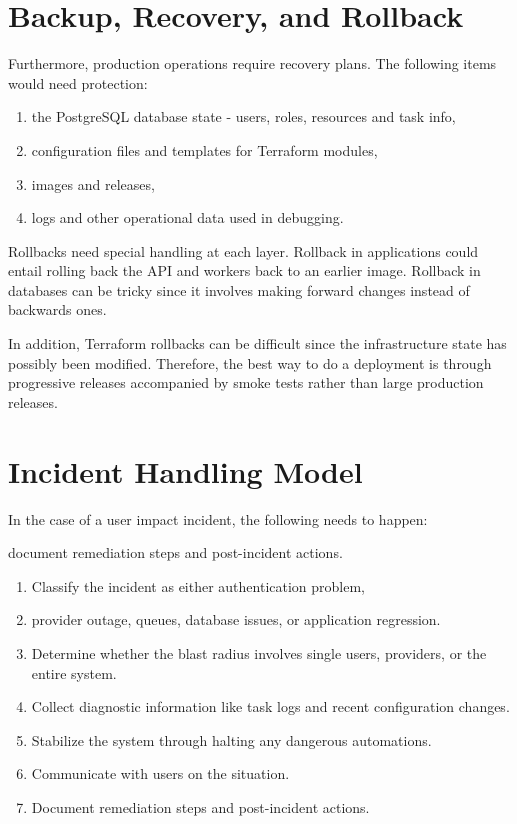 \section{Backup, Recovery, and Rollback}
Furthermore, production operations require recovery plans. The following items would need protection:





\begin{enumerate}
    \item the PostgreSQL database state - users, roles, resources and task info,
    \item configuration files and templates for Terraform modules,
    \item images and releases,
    \item logs and other operational data used in debugging.
\end{enumerate}

Rollbacks need special handling at each layer. Rollback in applications could entail rolling back the API and workers back to an earlier image. Rollback in databases can be tricky since it involves making forward changes instead of backwards ones.

In addition, Terraform rollbacks can be difficult since the infrastructure state has possibly been modified. Therefore, the best way to do a deployment is through progressive releases accompanied by smoke tests rather than large production releases.

\section{Incident Handling Model}
In the case of a user impact incident, the following needs to happen:
 




document remediation steps and post-incident actions.

\begin{enumerate}
    \item Classify the incident as either authentication problem,
    \item provider outage, queues, database issues, or application regression.
    \item Determine whether the blast radius involves single users, providers, or the entire system.
    \item Collect diagnostic information like task logs and recent configuration changes.
    \item Stabilize the system through halting any dangerous automations.
    \item Communicate with users on the situation.
    \item Document remediation steps and post-incident actions.
\end{enumerate}

